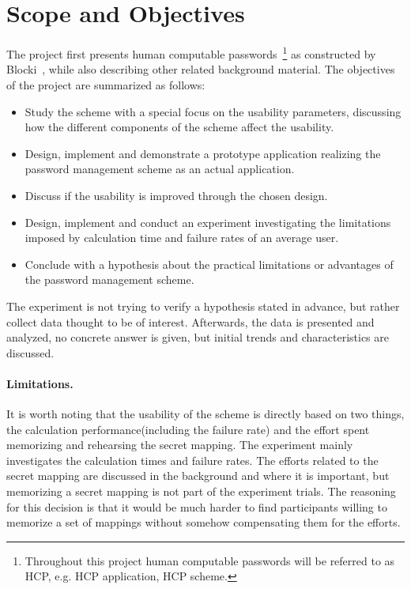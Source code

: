 
\section{Scope and Objectives}
The project first presents human computable passwords~\footnote{Throughout this project human computable passwords will be referred to as HCP, e.g. HCP application, HCP scheme.} as constructed by Blocki~\cite{hcp-blocki}, while also describing other related background material. The objectives of the project are summarized as follows:
\begin{itemize}
    \item Study the scheme with a special focus on the usability parameters, discussing how the different components of the scheme affect the usability.
    \item Design, implement and demonstrate a prototype application realizing the password management scheme as an actual application.
    \item Discuss if the usability is improved through the chosen design. 
    \item Design, implement and conduct an experiment investigating the limitations imposed by calculation time and failure rates of an average user.
    \item Conclude with a hypothesis about the practical limitations or advantages of the password management scheme.
\end{itemize}
\par The experiment is not trying to verify a hypothesis stated in advance, but rather collect data thought to be of interest. Afterwards, the data is presented and analyzed, no concrete answer is given, but initial trends and characteristics are discussed.
\paragraph{Limitations.}
It is worth noting that the usability of the scheme is directly based on two things, the calculation performance(including the failure rate) and the effort spent memorizing and rehearsing the secret mapping. The experiment mainly investigates the calculation times and failure rates. The efforts related to the secret mapping are discussed in the background and where it is important, but memorizing a secret mapping is not part of the experiment trials. The reasoning for this decision is that it would be much harder to find participants willing to memorize a set of mappings without somehow compensating them for the efforts.



